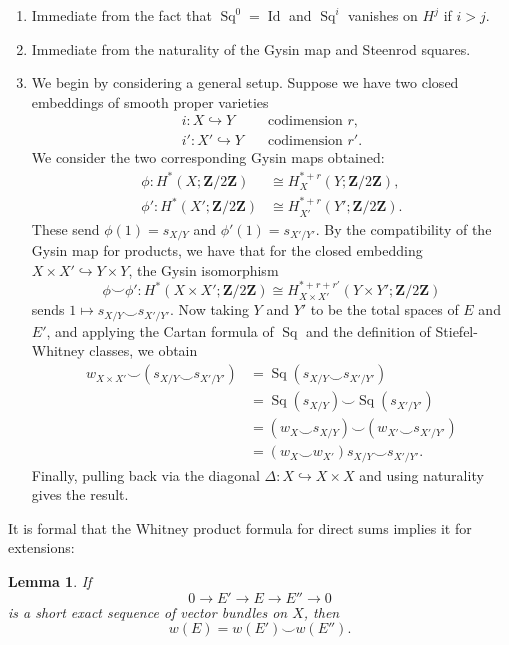 \documentclass[10pt, reqno]{amsart}
\numberwithin{equation}{subsection}
\newcommand{\Z}{\mathbf{Z}}
\DeclareMathOperator{\Id}{Id}
\DeclareMathOperator{\Sq}{Sq}
\newtheorem{lemma}[thm]{Lemma}
\theoremstyle{remark}
\begin{document}
\begin{enumerate}
\item Immediate from the fact that $\Sq^0 = \Id$ and $\Sq^i$ vanishes on $H^j$ if $i>j$.
\item Immediate from the naturality of the Gysin map and Steenrod squares.
\item We begin by considering a general setup. Suppose we have two closed embeddings of smooth proper varieties
\begin{align*}
i \colon X \hookrightarrow Y & \quad \text{codimension $r$}, \\
i' \colon X' \hookrightarrow Y & \quad \text{codimension $r'$}.
\end{align*}
We consider the two corresponding Gysin maps obtained:
\begin{align*}
\phi \colon H^*(X; \Z/2\Z) & \cong H^{*+r}_X(Y; \Z/2\Z), \\
\phi' \colon H^*(X'; \Z/2\Z) & \cong H^{*+r}_{X'}(Y'; \Z/2\Z).
\end{align*}
These send $\phi(1) = s_{X/Y} $ and $\phi'(1) =s_{X'/Y'}$. By the compatibility of the Gysin map for products, we have that for the closed embedding $X \times X' \hookrightarrow Y \times Y$, the Gysin isomorphism 
\[
\phi \smile \phi' \colon H^*(X \times X'; \Z/2\Z) \cong  H^{*+r+r'}_{X \times X'}(Y \times Y'; \Z/2\Z) 
\]
sends $1 \mapsto s_{X/Y}  \smile s_{X'/Y'}$. Now taking $Y$ and $Y'$ to be the total spaces of $E$ and $E'$, and applying the Cartan formula of $\Sq$ and the definition of Stiefel-Whitney classes, we obtain
\begin{align*}
w_{X \times X'} \smile (s_{X/Y} \smile s_{X'/Y'})  &= \Sq (s_{X/Y} \smile s_{X'/Y'}) \\
& = \Sq  (s_{X/Y})  \smile \Sq (s_{X'/Y'} ) \\ 
&= (w_X \smile s_{X/Y}) \smile (w_{X'} \smile s_{X'/Y'}) \\
&= (w_X \smile w_{X'}) s_{X/Y} \smile s_{X'/Y'}.
\end{align*}
Finally, pulling back via the diagonal $\Delta \colon X \hookrightarrow X \times X$ and using naturality gives the result. 

\end{enumerate}

It is formal that the Whitney product formula for direct sums implies it for extensions: 

\begin{lemma}
If 
\[
0 \rightarrow E' \rightarrow E \rightarrow E'' \rightarrow 0
\]
is a short exact sequence of vector bundles on $X$, then 
\[
w(E) = w(E') \smile  w(E'').
\]
\end{lemma}
\end{document}

